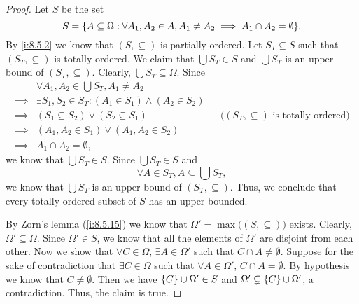 \begin{proof}
  Let \(S\) be the set
  \[
    S = \set{A \subseteq \Omega : \forall A_1, A_2 \in A, A_1 \neq A_2 \implies A_1 \cap A_2 = \emptyset}.
  \]
  By \cref{i:8.5.2} we know that \((S, \subseteq)\) is partially ordered.
  Let \(S_T \subseteq S\) such that \((S_T, \subseteq)\) is totally ordered.
  We claim that \(\bigcup S_T \in S\) and \(\bigcup S_T\) is an upper bound of \((S_T, \subseteq)\).
  Clearly, \(\bigcup S_T \subseteq \Omega\).
  Since
  \begin{align*}
             & \forall A_1, A_2 \in \bigcup S_T, A_1 \neq A_2                                                                     \\
    \implies & \exists S_1, S_2 \in S_T : (A_1 \in S_1) \land (A_2 \in S_2)                                                       \\
    \implies & (S_1 \subseteq S_2) \lor (S_2 \subseteq S_1)                 &  & \text{(\((S_T, \subseteq)\) is totally ordered)} \\
    \implies & (A_1, A_2 \in S_1) \lor (A_1, A_2 \in S_2)                                                                         \\
    \implies & A_1 \cap A_2 = \emptyset,
  \end{align*}
  we know that \(\bigcup S_T \in S\).
  Since \(\bigcup S_T \in S\) and
  \[
    \forall A \in S_T, A \subseteq \bigcup S_T,
  \]
  we know that \(\bigcup S_T\) is an upper bound of \((S_T, \subseteq)\).
  Thus, we conclude that every totally ordered subset of \(S\) has an upper bounded.

  By Zorn's lemma (\cref{i:8.5.15}) we know that \(\Omega' = \max\big((S, \subseteq)\big)\) exists.
  Clearly, \(\Omega' \subseteq \Omega\).
  Since \(\Omega' \in S\), we know that all the elements of \(\Omega'\) are disjoint from each other.
  Now we show that \(\forall C \in \Omega\), \(\exists A \in \Omega'\) such that \(C \cap A \neq \emptyset\).
  Suppose for the sake of contradiction that \(\exists C \in \Omega\) such that \(\forall A \in \Omega'\), \(C \cap A = \emptyset\).
  By hypothesis we know that \(C \neq \emptyset\).
  Then we have \(\left\lbrace C\right\rbrace \cup \Omega' \in S\) and \(\Omega' \subsetneq \left\lbrace C\right\rbrace \cup \Omega'\), a contradiction.
  Thus, the claim is true.


\end{proof}
